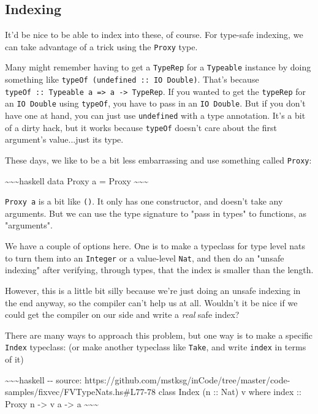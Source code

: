 \documentclass[]{article}
\begin{document}
\subsection{Indexing}

It'd be nice to be able to index into these, of course. For type-safe indexing,
we can take advantage of a trick using the \texttt{Proxy} type.

Many might remember having to get a \texttt{TypeRep} for a \texttt{Typeable}
instance by doing something like \texttt{typeOf\ (undefined\ ::\ IO\ Double)}.
That's because
\texttt{typeOf\ ::\ Typeable\ a\ =\textgreater{}\ a\ -\textgreater{}\ TypeRep}.
If you wanted to get the \texttt{typeRep} for an \texttt{IO\ Double} using
\texttt{typeOf}, you have to pass in an \texttt{IO\ Double}. But if you don't
have one at hand, you can just use \texttt{undefined} with a type annotation.
It's a bit of a dirty hack, but it works because \texttt{typeOf} doesn't care
about the first argument's value...just its type.

These days, we like to be a bit less embarrassing and use something called
\texttt{Proxy}:

\textasciitilde{}\textasciitilde{}\textasciitilde{}haskell data Proxy a = Proxy
\textasciitilde{}\textasciitilde{}\textasciitilde{}

\texttt{Proxy\ a} is a bit like \texttt{()}. It only has one constructor, and
doesn't take any arguments. But we can use the type signature to "pass in types"
to functions, as "arguments".

We have a couple of options here. One is to make a typeclass for type level nats
to turn them into an \texttt{Integer} or a value-level \texttt{Nat}, and then do
an "unsafe indexing" after verifying, through types, that the index is smaller
than the length.

However, this is a little bit silly because we're just doing an unsafe indexing
in the end anyway, so the compiler can't help us at all. Wouldn't it be nice if
we could get the compiler on our side and write a \emph{real} safe index?

There are many ways to approach this problem, but one way is to make a specific
\texttt{Index} typeclass: (or make another typeclass like \texttt{Take}, and
write \texttt{index} in terms of it)

\textasciitilde{}\textasciitilde{}\textasciitilde{}haskell -\/- source:
https://github.com/mstksg/inCode/tree/master/code-samples/fixvec/FVTypeNats.hs\#L77-78
class Index (n :: Nat) v where index :: Proxy n -\textgreater{} v a
-\textgreater{} a \textasciitilde{}\textasciitilde{}\textasciitilde{}
\end{document}
